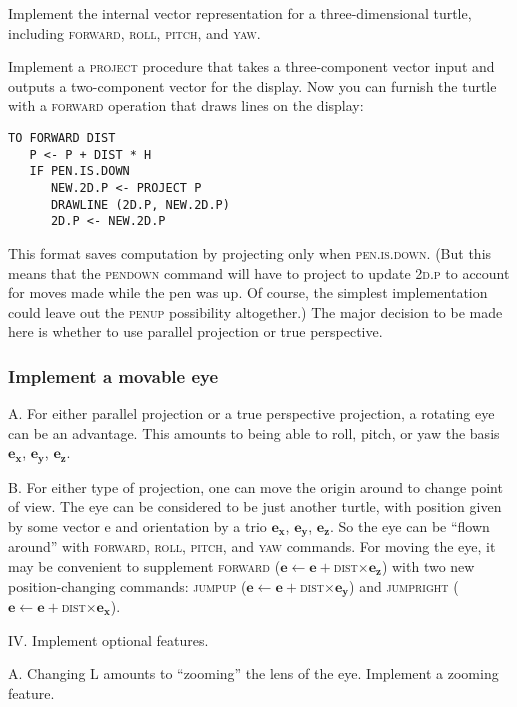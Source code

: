 \documentclass{book}
\begin{document}
Implement the internal vector representation for a three-dimensional
turtle, including \textsc{forward}, \textsc{roll}, \textsc{pitch}, and \textsc{yaw}.

Implement a \textsc{project} procedure that takes a three-component vector
input and outputs a two-component vector for the display. Now you
can furnish the turtle with a \textsc{forward} operation that draws lines on the
display:

\begin{verbatim}
TO FORWARD DIST
   P <- P + DIST * H
   IF PEN.IS.DOWN
      NEW.2D.P <- PROJECT P
      DRAWLINE (2D.P, NEW.2D.P) 
      2D.P <- NEW.2D.P
\end{verbatim}
This format saves computation by projecting only when \textsc{pen}\textsc{.is}\textsc{.down}.
(But this means that the \textsc{pendown} command will have to project to
update \textsc{2d}\textsc{.p} to account for moves made while the pen was up. Of
course, the simplest implementation could leave out the \textsc{penup} possibility
altogether.) The major decision to be made here is whether to use
parallel projection or true perspective.

\subsubsection{Implement a movable eye}

A. For either parallel projection or a true perspective projection, a
rotating eye can be an advantage. This amounts to being able to roll,
pitch, or yaw the basis $\mathbf{e_x}$, $\mathbf{e_y}$, $\mathbf{e_z}$.

B. For either type of projection, one can move the origin around to
change point of view. The eye can be considered to be just another
turtle, with position given by some vector e and orientation by a trio $\mathbf{e_x}$,
$\mathbf{e_y}$, $\mathbf{e_z}$. So the eye can be ``flown around'' with \textsc{forward}, \textsc{roll}, \textsc{pitch}, and
\textsc{yaw} commands. For moving the eye, it may be convenient to supplement
\textsc{forward} ($\mathbf{e} \leftarrow \mathbf{e} +$\textsc{dist}$\times \mathbf{e_z}$) with two new position-changing commands:
\textsc{jumpup} ($\mathbf{e} \leftarrow \mathbf{e} + $\textsc{dist}$\times \mathbf{e_y}$) and \textsc{jump}\textsc{right} ($\mathbf{e} \leftarrow \mathbf{e} + $\textsc{dist}$ \times \mathbf{e_x}$).

IV. Implement optional features.

A. Changing L amounts to ``zooming'' the lens of the eye. Implement a
zooming feature.
\end{document}
